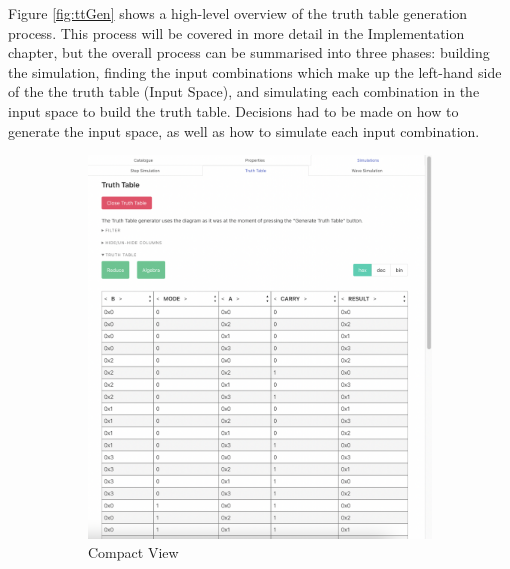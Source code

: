 Figure \ref{fig:ttGen} shows a high-level overview of the truth table generation process. This process will be covered in more detail in the Implementation chapter, but the overall process can be summarised into three phases: building the simulation, finding the input combinations which make up the left-hand side of the the truth table (Input Space), and simulating each combination in the input space to build the truth table. Decisions had to be made on how to generate the input space, as well as how to simulate each input combination.

\begin{figure}[h]
     \centering
     \begin{subfigure}[b]{0.48\textwidth}
         \centering
         \includegraphics[width=\textwidth]{04.AnalysisDesign/compact.png}
         \caption{Compact View}
         \label{fig:compact}
     \end{subfigure}
     \begin{subfigure}[b]{0.48\textwidth}
         \centering

\end{subfigure}
\end{figure}
